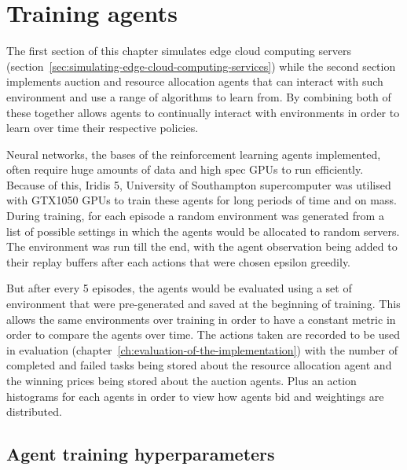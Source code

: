 \section{Training agents}\label{sec:training-agents}
The first section of this chapter simulates edge cloud computing servers (section~\ref{sec:simulating-edge-cloud-computing-services})
while the second section implements auction and resource allocation agents that can interact with such environment
and use a range of algorithms to learn from. By combining both of these together allows agents to continually interact
with environments in order to learn over time their respective policies.

Neural networks, the bases of the reinforcement learning agents implemented, often require huge amounts of data and
high spec GPUs to run efficiently. Because of this, Iridis 5, University of Southampton supercomputer was utilised with
GTX1050 GPUs to train these agents for long periods of time and on mass. During training, for each episode a random
environment was generated from a list of possible settings in which the agents would be allocated to random servers. The
environment was run till the end, with the agent observation being added to their replay buffers after each actions
that were chosen epsilon greedily.

But after every 5 episodes, the agents would be evaluated using a set of environment that were pre-generated and
saved at the beginning of training. This allows the same environments over training in order to have a constant metric
in order to compare the agents over time. The actions taken are recorded to be used in evaluation
(chapter~\ref{ch:evaluation-of-the-implementation}) with the number of completed and failed tasks being stored about
the resource allocation agent and the winning prices being stored about the auction agents. Plus an action histograms
for each agents in order to view how agents bid and weightings are distributed.


\subsection{Agent training hyperparameters}\label{subsec:agent-training-hyperparameters}

